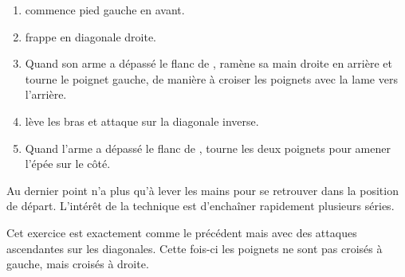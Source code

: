 \begin{exercice}

\begin{enumerate}
	\item \A commence pied gauche en avant.
	\item \A frappe en diagonale droite.
	\item Quand son arme a dépassé le flanc de \D, \A ramène sa main droite en arrière et tourne le poignet gauche, de manière à croiser les poignets avec la lame vers l'arrière.
	\item \A lève les bras et attaque sur la diagonale inverse.
	\item Quand l'arme a dépassé le flanc de \D, \A tourne les deux poignets pour amener l'épée sur le côté.
\end{enumerate}

Au dernier point \A n'a plus qu'à lever les mains pour se retrouver dans la position de départ. L'intérêt de la technique est d'enchaîner rapidement plusieurs séries.

\end{exercice}


\begin{exercice}
Cet exercice est exactement comme le précédent mais avec des attaques ascendantes sur les diagonales. Cette fois-ci les poignets ne sont pas croisés à gauche, mais croisés à droite.

\end{exercice}


% 
% 
% 


